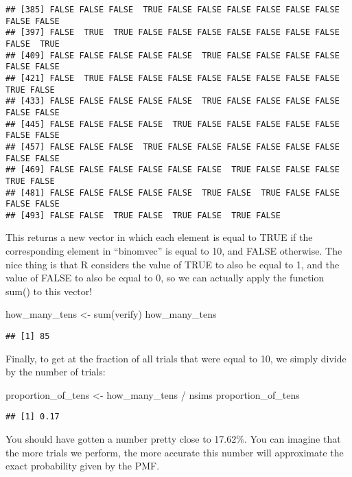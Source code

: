 \documentclass[
]{book}
\newenvironment{Shaded}{\begin{snugshade}}{\end{snugshade}}
\newcommand{\FunctionTok}[1]{\textcolor[rgb]{0.00,0.00,0.00}{#1}}
\newcommand{\NormalTok}[1]{#1}
\newcommand{\OtherTok}[1]{\textcolor[rgb]{0.56,0.35,0.01}{#1}}
\newcommand{\SpecialCharTok}[1]{\textcolor[rgb]{0.00,0.00,0.00}{#1}}
\begin{document}
\begin{verbatim}
## [385] FALSE FALSE FALSE  TRUE FALSE FALSE FALSE FALSE FALSE FALSE FALSE FALSE
## [397] FALSE  TRUE  TRUE FALSE FALSE FALSE FALSE FALSE FALSE FALSE FALSE  TRUE
## [409] FALSE FALSE FALSE FALSE FALSE  TRUE FALSE FALSE FALSE FALSE FALSE FALSE
## [421] FALSE  TRUE FALSE FALSE FALSE FALSE FALSE FALSE FALSE FALSE  TRUE FALSE
## [433] FALSE FALSE FALSE FALSE FALSE  TRUE FALSE FALSE FALSE FALSE FALSE FALSE
## [445] FALSE FALSE FALSE FALSE  TRUE FALSE FALSE FALSE FALSE FALSE FALSE FALSE
## [457] FALSE FALSE FALSE  TRUE FALSE FALSE FALSE FALSE FALSE FALSE FALSE FALSE
## [469] FALSE FALSE FALSE FALSE FALSE FALSE  TRUE FALSE FALSE FALSE  TRUE FALSE
## [481] FALSE FALSE FALSE FALSE FALSE  TRUE FALSE  TRUE FALSE FALSE FALSE FALSE
## [493] FALSE FALSE  TRUE FALSE  TRUE FALSE  TRUE FALSE
\end{verbatim}

This returns a new vector in which each element is equal to TRUE if the corresponding element in ``binomvec'' is equal to 10, and FALSE otherwise. The nice thing is that R considers the value of TRUE to also be equal to 1, and the value of FALSE to also be equal to 0, so we can actually apply the function sum() to this vector!

\begin{Shaded}
\begin{Highlighting}[]
\NormalTok{how\_many\_tens }\OtherTok{\textless{}{-}} \FunctionTok{sum}\NormalTok{(verify)}
\NormalTok{how\_many\_tens}
\end{Highlighting}
\end{Shaded}

\begin{verbatim}
## [1] 85
\end{verbatim}

Finally, to get at the fraction of all trials that were equal to 10, we simply divide by the number of trials:

\begin{Shaded}
\begin{Highlighting}[]
\NormalTok{proportion\_of\_tens }\OtherTok{\textless{}{-}}\NormalTok{ how\_many\_tens }\SpecialCharTok{/}\NormalTok{ nsims}
\NormalTok{proportion\_of\_tens}
\end{Highlighting}
\end{Shaded}

\begin{verbatim}
## [1] 0.17
\end{verbatim}

You should have gotten a number pretty close to 17.62\%. You can imagine that the more trials we perform, the more accurate this number will approximate the exact probability given by the PMF.
\end{document}
